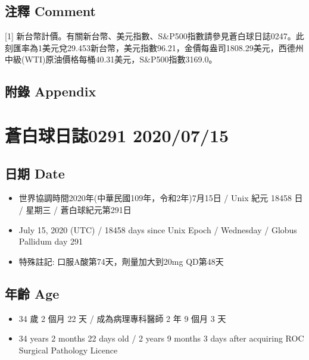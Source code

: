 \documentclass[a5paper, 11pt
]{book}
\providecommand{\tightlist}{%
  \setlength{\itemsep}{0pt}\setlength{\parskip}{0pt}}
\begin{document}
\hypertarget{ux6ce8ux91cb-comment-43}{%
\subsection{注釋 Comment}\label{ux6ce8ux91cb-comment-43}}

{[}1{]}
新台幣計價。有關新台幣、美元指數、S\&P500指數請參見蒼白球日誌0247。此刻匯率為1美元兌29.453新台幣，美元指數96.21，金價每盎司1808.29美元，西德州中級(WTI)原油價格每桶40.31美元，S\&P500指數3169.0。

\hypertarget{ux9644ux9304-appendix-43}{%
\subsection{附錄 Appendix}\label{ux9644ux9304-appendix-43}}

\hypertarget{ux84bcux767dux7403ux65e5ux8a8c0291-20200715}{%
\section{蒼白球日誌0291
2020/07/15}\label{ux84bcux767dux7403ux65e5ux8a8c0291-20200715}}

\hypertarget{ux65e5ux671f-date-44}{%
\subsection{日期 Date}\label{ux65e5ux671f-date-44}}

\begin{itemize}
\tightlist
\item
  世界協調時間2020年(中華民國109年，令和2年)7月15日 / Unix 紀元 18458 日
  / 星期三 / 蒼白球紀元第291日
\item
  July 15, 2020 (UTC) / 18458 days since Unix Epoch / Wednesday / Globus
  Pallidum day 291
\item
  特殊註記: 口服A酸第74天，劑量加大到20mg QD第48天
\end{itemize}

\hypertarget{ux5e74ux9f61-age-44}{%
\subsection{年齡 Age}\label{ux5e74ux9f61-age-44}}

\begin{itemize}
\tightlist
\item
  34 歲 2 個月 22 天 / 成為病理專科醫師 2 年 9 個月 3 天
\item
  34 years 2 months 22 days old / 2 years 9 months 3 days after
  acquiring ROC Surgical Pathology Licence
\end{itemize}
\end{document}
